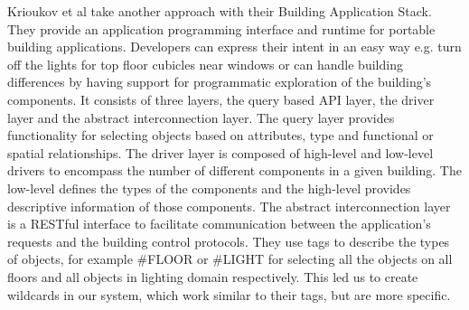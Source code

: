 Krioukov et al \cite{Krioukov12} take another approach with their Building Application Stack. They provide an application programming interface and runtime for portable building applications. Developers can express their intent in an easy way e.g. turn off the lights for top floor cubicles near windows or can handle building differences by having support for programmatic exploration of the building's components. It consists of three layers, the query based API layer, the driver layer and the abstract interconnection layer. 
The query layer provides functionality for selecting objects based on attributes, type and functional or spatial relationships. The driver layer is composed of high-level and low-level drivers to encompass the number of different components in a given building. The low-level defines the types of the components and the high-level provides descriptive information of those components. The abstract interconnection layer is a RESTful interface to facilitate communication between the application's requests and the building control protocols. They use tags to describe the types of objects, for example \#FLOOR or \#LIGHT for selecting all the objects on all floors and all objects in lighting domain respectively. This led us to create wildcards in our system, which work similar to their tags, but are more specific. 
